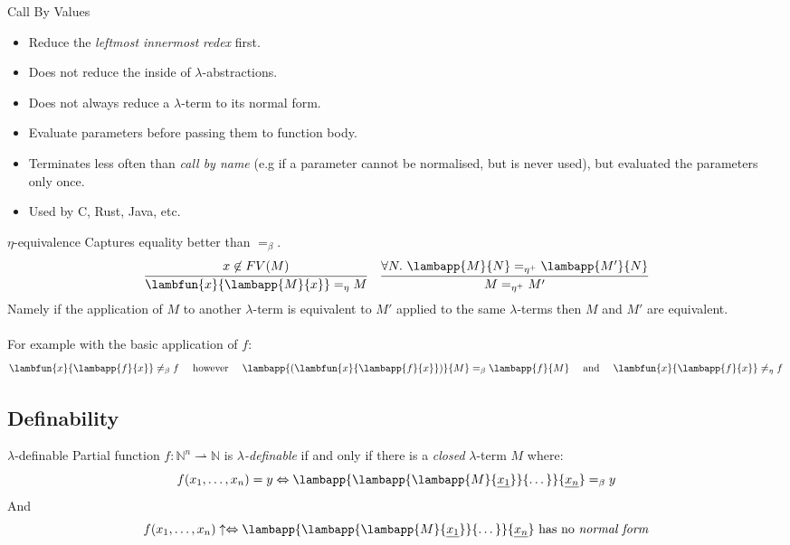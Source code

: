 \begin{definitionbox}{Call By Values}
    \begin{itemize}
        \item Reduce the \textit{leftmost innermost} \textit{redex} first.
        \item Does not reduce the inside of $\lambda$-abstractions.
        \item Does not always reduce a $\lambda$-term to its normal form.
        \item Evaluate parameters before passing them to function body.
        \item Terminates less often than \textit{call by name} (e.g if a parameter cannot be normalised, but is never used), but evaluated the parameters only once.
        \item Used by C, Rust, Java, etc.
    \end{itemize}
\end{definitionbox}

\begin{definitionbox}{$\eta$-equivalence}
Captures equality better than $=_\beta$.
\[\begin{matrix}
        \cfrac{x \not\in FV(M)}{\lambfun{x}{\lambapp{M}{x}} =_\eta M} & \cfrac{\forall N. \ \lambapp{M}{N} =_{\eta^+} \lambapp{M'}{N}}{M =_{\eta^+} M'}
    \end{matrix}\]
Namely if the application of $M$ to another $\lambda$-term is equivalent to $M'$ applied to the same $\lambda$-terms then $M$ and $M'$ are equivalent.
\\
\\ For example with the basic application of $f$:
\[\begin{matrix}
        \lambfun{x}{\lambapp{f}{x}} \neq_\beta f & \text{  however  } & \lambapp{(\lambfun{x}{\lambapp{f}{x}})}{M} =_\beta \lambapp{f}{M} & \text{  and  } & \lambfun{x}{\lambapp{f}{x}} \neq_\eta f \\
    \end{matrix}\]
\end{definitionbox}

\subsection{Definability}
\begin{definitionbox}{$\lambda$-definable}
	Partial function $f: \mathbb{N}^n \rightharpoonup \mathbb{N}$ is \textit{$\lambda$-definable} if and only if there is a \textit{closed} $\lambda$-term $M$ where:
	\[f(x_1, \dots, x_n) = y \Leftrightarrow \lambapp{\lambapp{\lambapp{M}{\underline{x_1}}}{\dots}}{\underline{x_n}} =_\beta y\]
	And
	\[f(x_1, \dots, x_n)\uparrow \Leftrightarrow \lambapp{\lambapp{\lambapp{M}{\underline{x_1}}}{\dots}}{\underline{x_n}} \text{  has no \textit{normal form}}\]
\end{definitionbox}

